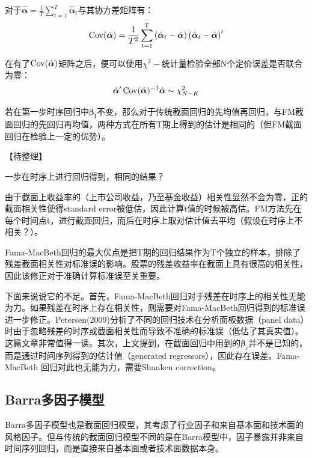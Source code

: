 \documentclass[11pt]{article}
\begin{document}
对于$\hat{\bm{\alpha}} = \frac{1}{T} \sum_{t=1}^{T} \hat{\bm{\alpha}}_{t}$与其协方差矩阵有：
\begin{equation*}
    \operatorname{Cov}(\hat{\bm{\alpha}})
    = \frac{1}{T^2} \sum_{t=1}^{T} \left(\hat{\bm{\alpha}}_t - \hat{\bm{\alpha}}\right) \left(\hat{\bm{\alpha}}_t - \hat{\bm{\alpha}}\right)'
\end{equation*}

在有了$\operatorname{Cov}(\hat{\bm{\alpha}})$矩阵之后，便可以使用$\chi^2-$统计量检验全部N个定价误差是否联合为零：
\begin{equation*}
    \hat{\bm{\alpha}}' \operatorname{Cov}(\hat{\bm{\alpha}})^{-1} \hat{\bm{\alpha}} \sim \chi_{N-K}^{2}
\end{equation*}

若在第一步时序回归中$\bm{\beta_i}$不变，那么对于传统截面回归的先均值再回归，与FM截面回归的先回归再均值，两种方式在所有T期上得到的估计是相同的（但FM截面回归在检验上一定的优势）。

【待整理】

一步在时序上进行回归得到，相同的结果？

由于截面上收益率的（上市公司收益，乃至基金收益）相关性显然不会为零，正的截面相关性使得standard error被低估，因此计算t值的时候被高估。FM方法先在每个时间点t，进行截面回归，而后在时序上取对估计值去平均（假设在时序上不相关？）。

Fama-MacBeth回归的最大优点是把T期的回归结果作为T个独立的样本，排除了残差截面相关性对标准误的影响。股票的残差收益率在截面上具有很高的相关性，因此该修正对于准确计算标准误至关重要。

下面来说说它的不足。首先，Fama-MacBeth回归对于残差在时序上的相关性无能为力。如果残差在时序上存在相关性，则需要对Fama-MacBeth回归得到的标准误进一步修正。Petersen(2009)分析了不同的回归技术在分析面板数据（panel data）时由于忽略残差的时序或截面相关性而导致不准确的标准误（低估了其真实值）。这篇文章非常值得一读。其次，上文提到，在截面回归中用到的$\bm{\beta}_i$并不是已知的，而是通过时间序列得到的估计值（generated regressors），因此存在误差。Fama-MacBeth 回归对此也无能为力，需要Shanken correction。

\subsection{Barra多因子模型}

Barra多因子模型也是截面回归模型，其考虑了行业因子和来自基本面和技术面的风格因子。但与传统的截面回归模型不同的是在Barra模型中，因子暴露并非来自时间序列回归，而是直接来自基本面或者技术面数据本身。
\end{document}

